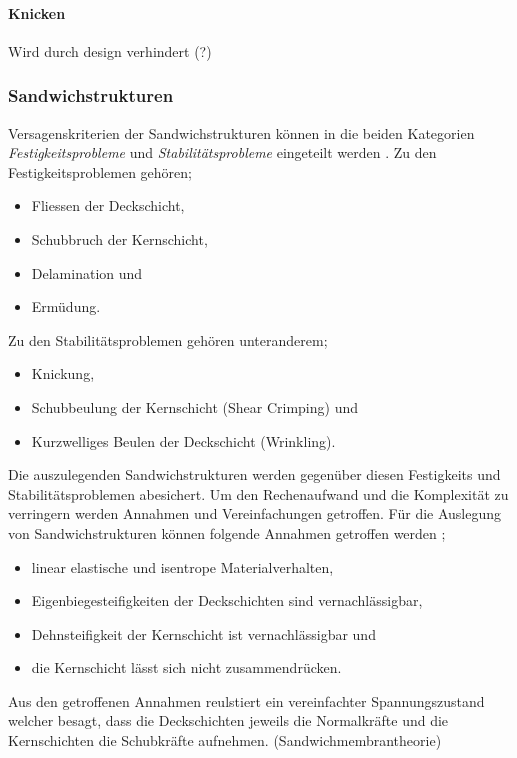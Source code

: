   \paragraph{Knicken}
  Wird durch design verhindert (?)

  \subsubsection{Sandwichstrukturen}
  Versagenskriterien der Sandwichstrukturen können in die beiden Kategorien \emph{Festigkeitsprobleme} und \emph{Stabilitätsprobleme} eingeteilt werden \cite{ETH}. Zu den Festigkeitsproblemen gehören;
  \begin{itemize}
    \item Fliessen der Deckschicht,
    \item Schubbruch der Kernschicht,
    \item Delamination und
    \item Ermüdung.
  \end{itemize}

  Zu den Stabilitätsproblemen gehören unteranderem;
  \begin{itemize}
    \item Knickung,
    \item Schubbeulung der Kernschicht (Shear Crimping) und
    \item Kurzwelliges Beulen der Deckschicht (Wrinkling).
  \end{itemize}

  Die auszulegenden Sandwichstrukturen werden gegenüber diesen Festigkeits und Stabilitätsproblemen abesichert. Um den Rechenaufwand und die Komplexität zu verringern werden Annahmen und Vereinfachungen getroffen. Für die Auslegung von Sandwichstrukturen können folgende Annahmen getroffen werden \cite{ETH}\cite{klein};
  \begin{itemize}
    \item linear elastische und isentrope Materialverhalten,
    \item Eigenbiegesteifigkeiten der Deckschichten sind vernachlässigbar,
    \item Dehnsteifigkeit der Kernschicht ist vernachlässigbar und
    \item die Kernschicht lässt sich nicht zusammendrücken.
  \end{itemize}
  Aus den getroffenen Annahmen reulstiert ein vereinfachter Spannungszustand welcher besagt, dass die Deckschichten jeweils die Normalkräfte und die Kernschichten die Schubkräfte aufnehmen. (Sandwichmembrantheorie)

